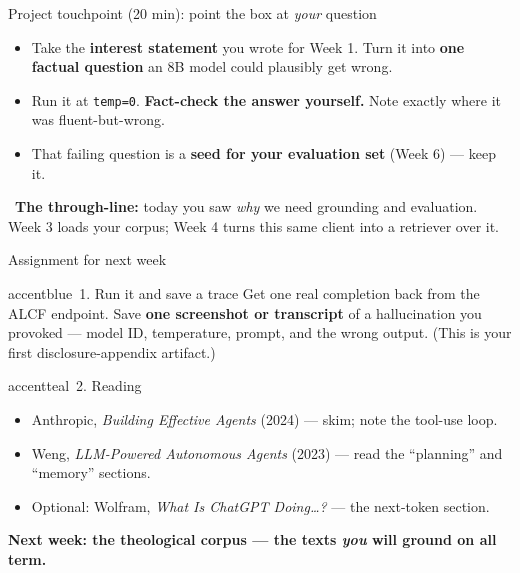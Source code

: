 \begin{frame}{Project touchpoint (20 min): point the box at \emph{your} question}
  \setlength{\leftmargini}{16pt}
  \begin{itemize}\small
    \item Take the \textbf{interest statement} you wrote for Week 1. Turn it into
      \textbf{one factual question} an 8B model could plausibly get wrong.
    \item Run it at \texttt{temp=0}. \textbf{Fact-check the answer yourself.} Note
      exactly where it was fluent-but-wrong.
    \item That failing question is a \textbf{seed for your evaluation set} (Week 6) ---
      keep it.
  \end{itemize}
  \vspace{6pt}
  \begin{calloutbox}[cRAG]
    \small\faLightbulb\ \textbf{The through-line:} today you saw \emph{why} we need
    grounding and evaluation. Week 3 loads your corpus; Week 4 turns this same client
    into a retriever over it.
  \end{calloutbox}
\end{frame}

\begin{frame}{Assignment for next week}
  \begin{featbox}{accentblue}{\faFlask\ 1. Run it and save a trace}
    \small
    Get one real completion back from the ALCF endpoint. Save \textbf{one screenshot
    or transcript} of a hallucination you provoked --- model ID, temperature, prompt,
    and the wrong output. (This is your first disclosure-appendix artifact.)
  \end{featbox}
  \vspace{7pt}
  \begin{featbox}{accentteal}{\faBookOpen\ 2. Reading}
    \small
    \begin{itemize}
      \item Anthropic, \emph{Building Effective Agents} (2024) --- skim; note the
        tool-use loop.
      \item Weng, \emph{LLM-Powered Autonomous Agents} (2023) --- read the
        ``planning'' and ``memory'' sections.
      \item Optional: Wolfram, \emph{What Is ChatGPT Doing\dots?} --- the next-token section.
    \end{itemize}
  \end{featbox}
  \vspace{6pt}
  \begin{center}\small\color{labnavy}\bfseries
    Next week: the theological corpus --- the texts \emph{you} will ground on all term.\end{center}
\end{frame}


